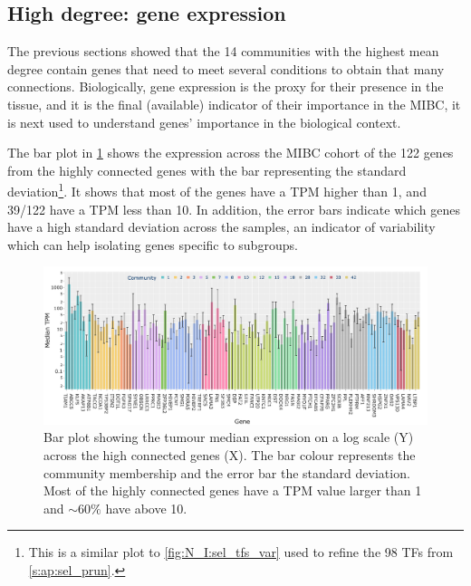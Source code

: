 \subsection{High degree: gene expression} \label{s:N_II:high_ge}

The previous sections showed that the 14 communities with the highest mean degree contain genes that need to meet several conditions to obtain that many connections. Biologically, gene expression is the proxy for their presence in the tissue, and it is the final (available) indicator of their importance in the MIBC, it is next used to understand genes' importance in the biological context.

The bar plot in \cref{fig:N_II:exp_molecular_highCon} shows the expression across the MIBC cohort of the 122 genes from the highly connected genes with the bar representing the standard deviation\footnote{This is a similar plot to \cref{fig:N_I:sel_tfs_var} used to refine the  98 TFs from \cref{s:ap:sel_prun}.}. It shows that most of the genes have a TPM higher than 1, and 39/122 have a TPM less than 10. In addition, the error bars indicate which genes have a high standard deviation across the samples, an indicator of variability which can help isolating genes specific to subgroups. 


\begin{figure}[!b]    
    \centering
    \includegraphics[width=1.0\textwidth,height=1.0\textheight,keepaspectratio]{Sections/Network_II/resources/reward/smallCom_Exp.png}
   \caption[Tumour median TPMs of highly connected genes]{Bar plot showing the tumour median expression on a log scale (Y) across the high connected genes (X). The bar colour represents the community membership and the error bar the standard deviation. Most of the highly connected genes have a TPM value larger than 1 and $\sim60\%$ have above 10. }
    \label{fig:N_II:exp_molecular_highCon}
\end{figure}

